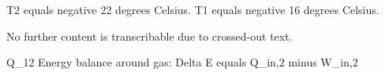 T2 equals negative 22 degrees Celsius.  
T1 equals negative 16 degrees Celsius.  

No further content is transcribable due to crossed-out text.

Q_12  
Energy balance around gas:  
Delta E equals Q_in,2 minus W_in,2